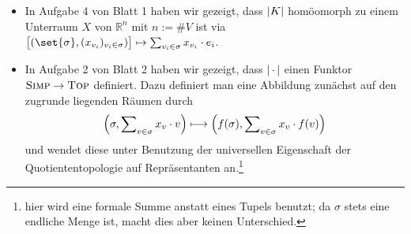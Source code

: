 \begin{itemize}
	\item In Aufgabe 4 von Blatt 1 haben wir gezeigt, dass $\abs*{K}$ homöomorph zu einem Unterraum $X$ von $\mathbb{R}^n$ mit $n:= \# V$ ist via $\benbrace[\big]{\enbrace*{\set{\sigma}, (x_{v_i})_{v_i \in \sigma} } } \mapsto \sum_{v_i \in \sigma} x_{v_i} \cdot e_i$.
	\item In Aufgabe 2 von Blatt 2 haben wir gezeigt, dass $\abs*{\,\cdot\,} $ einen Funktor $\SIMP \to \TOP$ definiert.
	Dazu definiert man eine Abbildung zunächst auf den zugrunde liegenden Räumen durch
	\[
		\enbrace*{\sigma, \sum\nolimits_{v \in \sigma} x_v \cdot v} \longmapsto \enbrace*{f(\sigma), \sum\nolimits_{v \in \sigma} x_v \cdot f(v)} 
	\]
	und wendet diese unter Benutzung der universellen Eigenschaft der Quotiententopologie auf Repräsentanten an.\footnote{hier wird eine formale Summe anstatt eines Tupels benutzt; da $\sigma$ stets eine endliche Menge ist, macht dies aber keinen Unterschied.}
\end{itemize}

